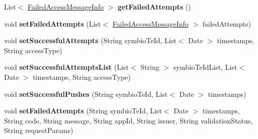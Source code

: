 \begin{DoxyCompactItemize}
List$<$ \hyperlink{classeu_1_1h2020_1_1symbiote_1_1core_1_1cci_1_1accessNotificationMessages_1_1FailedAccessMessageInfo}{Failed\+Access\+Message\+Info} $>$ {\bfseries get\+Failed\+Attempts} ()
\item 
\mbox{\label{classeu_1_1h2020_1_1symbiote_1_1core_1_1cci_1_1accessNotificationMessages_1_1NotificationMessage_abe9d409630e28276068ace008c59f299}} 
void {\bfseries set\+Failed\+Attempts} (List$<$ \hyperlink{classeu_1_1h2020_1_1symbiote_1_1core_1_1cci_1_1accessNotificationMessages_1_1FailedAccessMessageInfo}{Failed\+Access\+Message\+Info} $>$ failed\+Attempts)
\item 
\mbox{\label{classeu_1_1h2020_1_1symbiote_1_1core_1_1cci_1_1accessNotificationMessages_1_1NotificationMessage_a56eb620a2f0a4e985c69fe386e9b2ead}} 
void {\bfseries set\+Successful\+Attempts} (String symbio\+Te\+Id, List$<$ Date $>$ timestamps, String access\+Type)
\item 
\mbox{\label{classeu_1_1h2020_1_1symbiote_1_1core_1_1cci_1_1accessNotificationMessages_1_1NotificationMessage_aa6d412acd4056473d2b0794556cfdc9a}} 
void {\bfseries set\+Successful\+Attempts\+List} (List$<$ String $>$ symbio\+Te\+Id\+List, List$<$ Date $>$ timestamps, String access\+Type)
\item 
\mbox{\label{classeu_1_1h2020_1_1symbiote_1_1core_1_1cci_1_1accessNotificationMessages_1_1NotificationMessage_a96bd573dfac853991d530c4fc5f75568}} 
void {\bfseries set\+Successful\+Pushes} (String symbio\+Te\+Id, List$<$ Date $>$ timestamps)
\item 
\mbox{\label{classeu_1_1h2020_1_1symbiote_1_1core_1_1cci_1_1accessNotificationMessages_1_1NotificationMessage_a686cfd25198468b91df66802a11b6aa9}} 
void {\bfseries set\+Failed\+Attempts} (String symbio\+Te\+Id, List$<$ Date $>$ timestamps, String code, String message, String app\+Id, String issuer, String validation\+Status, String request\+Params)

\end{DoxyCompactItemize}
